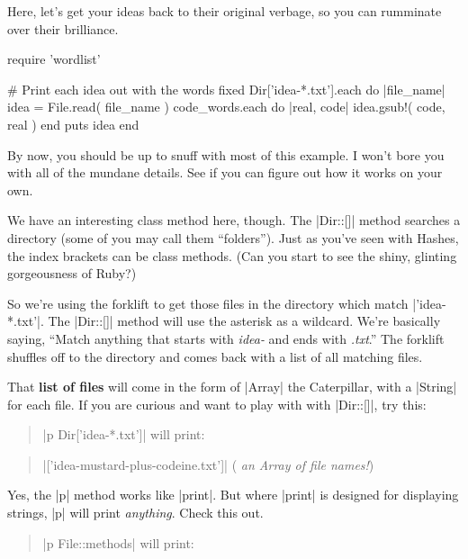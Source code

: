 \documentclass[12pt,twoside]{report}
\begin{document}
Here, let's get your ideas back to their original verbage, so you can
rumminate over their brilliance.


\begin{rubycode}

 require 'wordlist'

 # Print each idea out with the words fixed
 Dir['idea-*.txt'].each do |file_name|
   idea = File.read( file_name )
   code_words.each do |real, code|
     idea.gsub!( code, real )
   end
   puts idea
 end

\end{rubycode}

By now, you should be up to snuff with most of this example.  I won't
bore you with all of the mundane details.  See if you can figure out
how it works on your own.

We have an interesting class method here, though.  The
\rubyinline|Dir::[]| method searches a directory (some
of you may call them ``folders'').  Just as you've seen with Hashes,
the index brackets can be class methods.  (Can you start to see the
shiny, glinting gorgeousness of Ruby?)

So we're using the forklift to get those files in the directory which
match \rubyinline|'idea-*.txt'|.  The
\rubyinline|Dir::[]| method will use the asterisk as a
wildcard.  We're basically saying, ``Match anything that starts with
{\em idea-} and ends with {\em .txt}.''  The forklift shuffles off to
the directory and comes back with a list of all matching files.

That {\bf list of files} will come in the form of
\rubyinline|Array| the Caterpillar, with a
\rubyinline|String| for each file.  If you are curious
and want to play with with \rubyinline|Dir::[]|, try
this:

\begin{quote}
\rubyinline|p Dir['idea-*.txt']| will
print:\end{quote}


\begin{quote}
\rubyinline|['idea-mustard-plus-codeine.txt']| ({\em
  an Array of file names!})\end{quote}


Yes, the \rubyinline|p| method works like
\rubyinline|print|.  But where
\rubyinline|print| is designed for displaying strings,
\rubyinline|p| will print {\em anything}.  Check this
out.

\begin{quote}
\rubyinline|p File::methods| will print:\end{quote}
\end{document}
